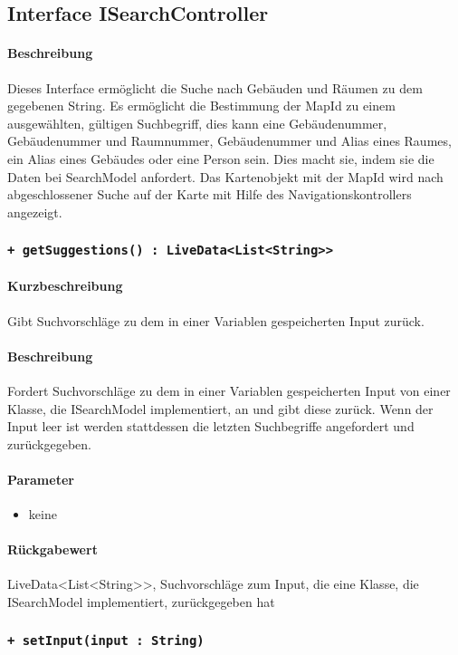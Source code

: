 \subsection{Interface ISearchController}
\paragraph*{Beschreibung}
Dieses Interface ermöglicht die Suche nach Gebäuden und Räumen zu dem gegebenen String. 
Es ermöglicht die Bestimmung der MapId zu einem ausgewählten, gültigen Suchbegriff, 
dies kann eine Gebäudenummer, Gebäudenummer und Raumnummer, Gebäudenummer und Alias eines Raumes, ein Alias eines Gebäudes oder eine Person sein.
Dies macht sie, indem sie die Daten bei SearchModel anfordert.
Das Kartenobjekt mit der MapId wird nach abgeschlossener Suche auf der Karte mit Hilfe des Navigationskontrollers angezeigt.


\subsubsection{\texttt{+ getSuggestions() : LiveData<List<String>>}}%
\paragraph*{Kurzbeschreibung}
Gibt Suchvorschläge zu dem in einer Variablen gespeicherten Input zurück.
\paragraph*{Beschreibung}
Fordert Suchvorschläge zu dem in einer Variablen gespeicherten Input von einer Klasse, die ISearchModel implementiert, an und gibt diese zurück.
Wenn der Input leer ist werden stattdessen die letzten Suchbegriffe angefordert und zurückgegeben.
\paragraph*{Parameter}
\begin{itemize}
    \item keine
\end{itemize}
\paragraph*{Rückgabewert}
LiveData<List<String>>, Suchvorschläge zum Input, die eine Klasse, die ISearchModel implementiert, zurückgegeben hat

\subsubsection{\texttt{+ setInput(input : String)}}%
